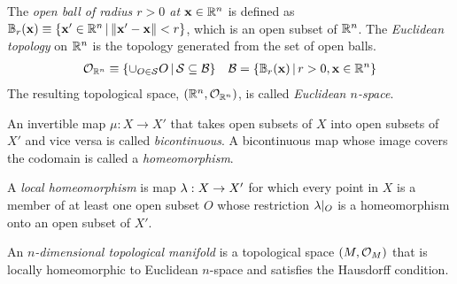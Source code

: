 \documentclass[11pt]{article}
\numberwithin{equation}{section}
\begin{document}
\begin{dfn}
The \textit{open ball of radius $r>0$ at $\mathbf{x}\in\mathbb{R}^n$} is defined as $\mathbb{B}_r(\mathbf{x})\equiv\{\mathbf{x}'\in\mathbb{R}^n\,|\,\|\mathbf{x}'-\mathbf{x}\|<r\}$, which is an open subset of $\mathbb{R}^n$.
The \textit{Euclidean topology} on $\mathbb{R}^n$ is the topology generated from the set of open balls.
\begin{align}
  \mathcal{O}_{\mathbb{R}^n}
\equiv
  \{
    \cup_{O\in \mathcal{S}}
    O
  \,|\,
    \mathcal{S}
  \subseteq
    \mathcal{B}
  \}
&&
  \mathcal{B}
=
  \{
    \mathbb{B}_r(\mathbf{x})
  \,|\,
    r>0,
    \mathbf{x}\in\mathbb{R}^n
  \}
\end{align}
The resulting topological space, $(\mathbb{R}^n, \mathcal{O}_{\mathbb{R}^n})$, is called \textit{Euclidean $n$-space}.
\end{dfn}


\begin{dfn}
An invertible map $\mu:X\rightarrow X'$ that takes open subsets of $X$ into open subsets of $X'$ and vice versa is called \textit{bicontinuous}.
A bicontinuous map whose image covers the codomain is called a \textit{homeomorphism}.
\end{dfn}

\begin{dfn}
A \textit{local homeomorphism} is map $\lambda :X\rightarrow X'$ for which every point in $X$ is a member of at least one open subset $O$ whose restriction $\lambda |_O$ is a homeomorphism onto an open subset of $X'$.
\end{dfn}

\begin{dfn}
An \textit{$n$-dimensional topological manifold} is a topological space  $(M, \mathcal{O}_M)$ that is locally homeomorphic to Euclidean $n$-space and satisfies the Hausdorff condition.
\end{dfn}

\begin{prop}
\end{prop}
\end{document}
